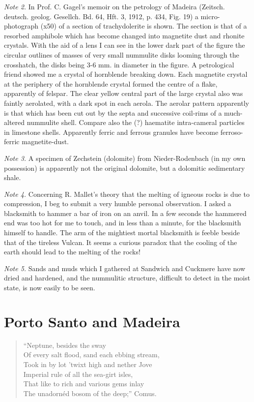 \documentclass[a4paper, 12pt, oneside]{article}
\begin{document}
\emph{Note 2.} In Prof. C. Gagel's memoir on the petrology of Madeira (Zeitsch. deutsch. geolog. Gesellch. Bd. 64, Hft. 3, 1912, p. 434, Fig. 19) a micro-photograph (x50) of a section of trachydolerite is shown. The section is that of a resorbed amphibole which has become changed into magnetite dust and rhonite crystals. With the aid of a lens I can see in the lower dark part of the figure the circular outlines of masses of very small nummulite disks looming through the crosshatch, the disks being 3-6 mm. in diameter in the figure. A petrological friend showed me a crystal of hornblende breaking down. Each magnetite crystal at the periphery of the hornblende crystal formed the centre of a flake, apparently of felspar. The clear yellow central part of the large crystal also was faintly aerolated, with a dark spot in each aerola. The aerolar pattern apparently is that which has been cut out by the septa and successive coil-rims of a much-altered nummulite shell. Compare also the (?) haematite intra-cameral particles in limestone shells. Apparently ferric and ferrous granules have become ferroso-ferric magnetite-dust.

\emph{Note 3.} A specimen of Zechstein (dolomite) from Nieder-Rodenbach (in my own possession) is apparently not the original dolomite, but a dolomitic sedimentary shale.

\emph{Note 4.} Concerning R. Mallet's theory that the melting of igneous rocks is due to compression, I beg to submit a very humble personal observation. I asked a blacksmith to hammer a bar of iron on an anvil. In a few seconds the hammered end was too hot for me to touch, and in less than a minute, for the blacksmith himself to handle. The arm of the mightiest mortal blacksmith is feeble beside that of the tireless Vulcan. It seems a curious paradox that the cooling of the earth should lead to the melting of the rocks!

\emph{Note 5.} Sands and muds which I gathered at Sandwich and Cuckmere have now dried and hardened, and the nummulitic structure, difficult to detect in the moist state, is now easily to be seen.
\normalsize
\clearpage
\section{Porto Santo and Madeira}
\begin{quote} 
\hspace*{15mm}``Neptune, besides the sway\\
Of every salt flood, sand each ebbing stream,\\
Took in by lot 'twixt high and nether Jove\\
Imperial rule of all the sea-girt isles,\\
That like to rich and various gems inlay\\
The unadornéd bosom of the deep;'' \hspace*{5mm}Comus.
\end{quote}
\end{document}
